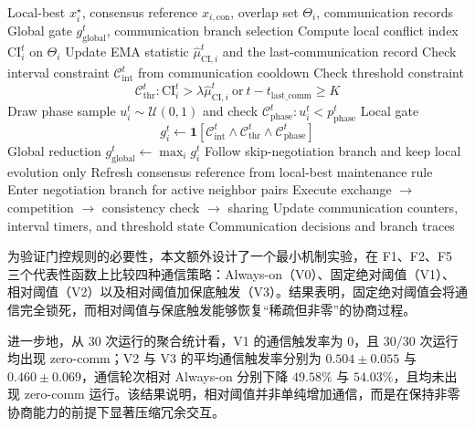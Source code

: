 \documentclass[12pt]{ctexart}
\begin{document}
\begin{algorithm}[htbp]
\caption{CI-Gated Communication with Phase Sampling (Abstract)}
\label{alg:ci_gating}
\begin{algorithmic}[1]
\Require Local-best \(x_i^\star\), consensus reference \(x_{i,\mathrm{con}}\), overlap set \(\Theta_i\), communication records
\Ensure Global gate \(g_{\mathrm{global}}^t\), communication branch selection
\State Compute local conflict index \(\mathrm{CI}_i^t\) on \(\Theta_i\)
\State Update EMA statistic \(\hat{\mu}_{\mathrm{CI},i}^t\) and the last-communication record
\State Check interval constraint \(\mathcal{C}_{\mathrm{int}}^t\) from communication cooldown
\State Check threshold constraint
\[
\mathcal{C}_{\mathrm{thr}}^t : \mathrm{CI}_i^t > \lambda\hat{\mu}_{\mathrm{CI},i}^t\ \text{or}\ t-t_{\mathrm{last\_comm}}\ge K
\]
  \State Draw phase sample \(u_i^t\sim\mathcal{U}(0,1)\) and check \(\mathcal{C}_{\mathrm{phase}}^t : u_i^t<p_{\mathrm{phase}}^t\)
  \State Local gate
  \[
  g_i^t\gets \mathbf{1}\!\left[\mathcal{C}_{\mathrm{int}}^t\land \mathcal{C}_{\mathrm{thr}}^t\land \mathcal{C}_{\mathrm{phase}}^t\right]
  \]
  \State Global reduction \(g_{\mathrm{global}}^t\gets \max_i g_i^t\)
    \State Follow skip-negotiation branch and keep local evolution only
    \State Refresh consensus reference from local-best maintenance rule
  \Else
    \State Enter negotiation branch for active neighbor pairs
    \State Execute exchange \(\rightarrow\) competition \(\rightarrow\) consistency check \(\rightarrow\) sharing
  \EndIf
  \State Update communication counters, interval timers, and threshold state
\EndFor
\State \Return Communication decisions and branch traces
\end{algorithmic}
\end{algorithm}

为验证门控规则的必要性，本文额外设计了一个最小机制实验，在 F1、F2、F5 三个代表性函数上比较四种通信策略：Always-on（V0）、固定绝对阈值（V1）、相对阈值（V2）以及相对阈值加保底触发（V3）。结果表明，固定绝对阈值会将通信完全锁死，而相对阈值与保底触发能够恢复“稀疏但非零”的协商过程。

进一步地，从 30 次运行的聚合统计看，V1 的通信触发率为 0，且 \(30/30\) 次运行均出现 zero-comm；V2 与 V3 的平均通信触发率分别为 \(0.504\pm0.055\) 与 \(0.460\pm0.069\)，通信轮次相对 Always-on 分别下降 \(49.58\%\) 与 \(54.03\%\)，且均未出现 zero-comm 运行。该结果说明，相对阈值并非单纯增加通信，而是在保持非零协商能力的前提下显著压缩冗余交互。
\end{document}

